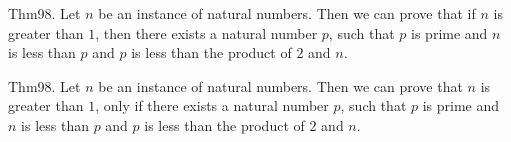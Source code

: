 \documentclass{article}
\begin{document}
Thm98. Let $n$ be an instance of natural numbers. Then we can prove that if $n$ is greater than $1$, then there exists a natural number $p$, such that $p$ is prime and $n$ is less than $p$ and $p$ is less than the product of $2$ and $n$.

Thm98. Let $n$ be an instance of natural numbers. Then we can prove that $n$ is greater than $1$, only if there exists a natural number $p$, such that $p$ is prime and $n$ is less than $p$ and $p$ is less than the product of $2$ and $n$.
\end{document}
